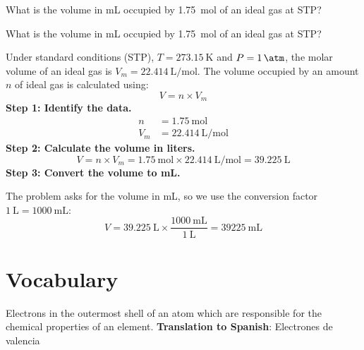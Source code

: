 \begin{exercise}
    What is the volume in mL occupied by \qty{1.75}{\mol} of an ideal gas at STP?
    \begin{solu}
        What is the volume in mL occupied by \qty{1.75}{\mol} of an ideal gas at STP?


        Under standard conditions (STP), $T = \qty{273.15}{\kelvin}$ and $P = \qty{1}{\atm}$,
        the molar volume of an ideal gas is $V_m = \qty{22.414}{\liter\per\mol}$. The volume
        occupied by an amount $n$ of ideal gas is calculated using:
        \begin{equation*}
            V = n \times V_m
        \end{equation*}
        \textbf{Step 1: Identify the data.}
        \begin{align*}
            n   &= \qty{1.75}{\mol} \\
            V_m &= \qty{22.414}{\liter\per\mol}
        \end{align*}
        \textbf{Step 2: Calculate the volume in liters.}
        \begin{equation*}
            V = n \times V_m = \qty{1.75}{\mol} \times \qty{22.414}{\liter\per\mol}
            = \qty{39.225}{\liter}
        \end{equation*}
        \textbf{Step 3: Convert the volume to mL.}

        The problem asks for the volume in mL, so we use the conversion factor
        $\qty{1}{\liter} = \qty{1000}{\mL}$:
        \begin{equation*}
            V = \qty{39.225}{\liter} \times \frac{\qty{1000}{\mL}}{\qty{1}{\liter}}
            = \boxed{\qty{39225}{\mL}}
        \end{equation*}
    \end{solu}
\end{exercise}


\section{Vocabulary}

\begin{vocabulary}
    Electrons in the outermost shell of an atom which are responsible for the chemical properties of an element. \newline
    \textbf{Translation to Spanish}: Electrones de valencia \newline
\end{vocabulary}

